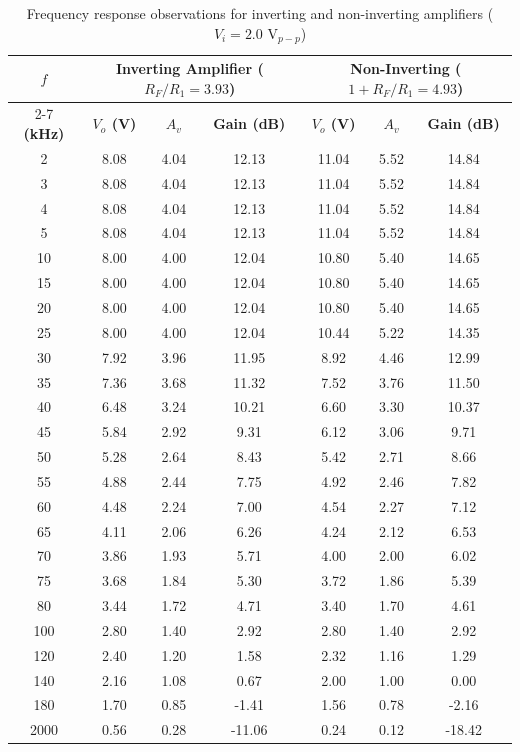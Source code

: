 \documentclass[12pt,a4paper]{article}
\begin{document}
\begin{table}[H]
\centering
\small
\caption{Frequency response observations for inverting and non-inverting amplifiers ($V_i = 2.0\text{ V}_{p-p}$)}
\begin{tabular}{|c|c|c|c|c|c|c|}
\hline
\textbf{$f$} & \multicolumn{3}{c|}{\textbf{Inverting Amplifier ($R_F/R_1 = 3.93$)}} & \multicolumn{3}{c|}{\textbf{Non-Inverting ($1 + R_F/R_1 = 4.93$)}} \\
\cline{2-7}
\textbf{(kHz)} & \textbf{$V_o$ (V)} & \textbf{$A_v$} & \textbf{Gain (dB)} & \textbf{$V_o$ (V)} & \textbf{$A_v$} & \textbf{Gain (dB)} \\
\hline
2 & 8.08 & 4.04 & 12.13 & 11.04 & 5.52 & 14.84 \\
3 & 8.08 & 4.04 & 12.13 & 11.04 & 5.52 & 14.84 \\
4 & 8.08 & 4.04 & 12.13 & 11.04 & 5.52 & 14.84 \\
5 & 8.08 & 4.04 & 12.13 & 11.04 & 5.52 & 14.84 \\
10 & 8.00 & 4.00 & 12.04 & 10.80 & 5.40 & 14.65 \\
15 & 8.00 & 4.00 & 12.04 & 10.80 & 5.40 & 14.65 \\
20 & 8.00 & 4.00 & 12.04 & 10.80 & 5.40 & 14.65 \\
25 & 8.00 & 4.00 & 12.04 & 10.44 & 5.22 & 14.35 \\
30 & 7.92 & 3.96 & 11.95 & 8.92 & 4.46 & 12.99 \\
35 & 7.36 & 3.68 & 11.32 & 7.52 & 3.76 & 11.50 \\
40 & 6.48 & 3.24 & 10.21 & 6.60 & 3.30 & 10.37 \\
45 & 5.84 & 2.92 & 9.31 & 6.12 & 3.06 & 9.71 \\
50 & 5.28 & 2.64 & 8.43 & 5.42 & 2.71 & 8.66 \\
55 & 4.88 & 2.44 & 7.75 & 4.92 & 2.46 & 7.82 \\
60 & 4.48 & 2.24 & 7.00 & 4.54 & 2.27 & 7.12 \\
65 & 4.11 & 2.06 & 6.26 & 4.24 & 2.12 & 6.53 \\
70 & 3.86 & 1.93 & 5.71 & 4.00 & 2.00 & 6.02 \\
75 & 3.68 & 1.84 & 5.30 & 3.72 & 1.86 & 5.39 \\
80 & 3.44 & 1.72 & 4.71 & 3.40 & 1.70 & 4.61 \\
100 & 2.80 & 1.40 & 2.92 & 2.80 & 1.40 & 2.92 \\
120 & 2.40 & 1.20 & 1.58 & 2.32 & 1.16 & 1.29 \\
140 & 2.16 & 1.08 & 0.67 & 2.00 & 1.00 & 0.00 \\
180 & 1.70 & 0.85 & -1.41 & 1.56 & 0.78 & -2.16 \\
2000 & 0.56 & 0.28 & -11.06 & 0.24 & 0.12 & -18.42 \\
\hline
\end{tabular}
\end{table}
\end{document}
